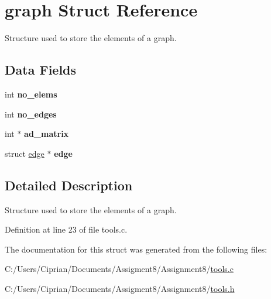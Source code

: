 \hypertarget{structgraph}{}\section{graph Struct Reference}
\label{structgraph}


Structure used to store the elements of a graph.  


\subsection*{Data Fields}
\begin{DoxyCompactItemize}
\item 
\mbox{\label{structgraph_a748ecc2b3e9633d66db394344830ad23}} 
int {\bfseries no\+\_\+elems}
\item 
\mbox{\label{structgraph_a8f67084d3de0e92f69a80ca764017513}} 
int {\bfseries no\+\_\+edges}
\item 
\mbox{\label{structgraph_ab954b98eac6d1ce636668c60593548dd}} 
int $\ast$ {\bfseries ad\+\_\+matrix}
\item 
\mbox{\label{structgraph_a25146948326bc196cebfc4827e36b118}} 
struct \mbox{\hyperlink{structedge}{edge}} $\ast$ {\bfseries edge}
\end{DoxyCompactItemize}


\subsection{Detailed Description}
Structure used to store the elements of a graph. 

Definition at line 23 of file tools.\+c.



The documentation for this struct was generated from the following files\+:\begin{DoxyCompactItemize}
\item 
C\+:/\+Users/\+Ciprian/\+Documents/\+Assigment8/\+Assignment8/\mbox{\hyperlink{tools_8c}{tools.\+c}}\item 
C\+:/\+Users/\+Ciprian/\+Documents/\+Assigment8/\+Assignment8/\mbox{\hyperlink{tools_8h}{tools.\+h}}\end{DoxyCompactItemize}
